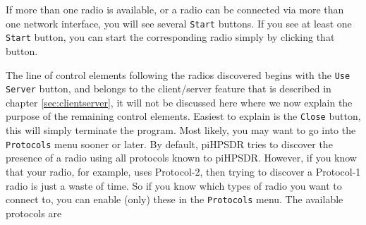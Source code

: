\documentclass[12pt]{book}
\def\rett#1{\texttt{\color{red}#1}}
\def\pH{pi\-HPSDR\xspace}
\begin{document}
If more than one radio is available, or a radio can be connected via more than one network interface,
you will see several \rett{Start} buttons.
If you see at least one \rett{Start} button, you can start the corresponding radio simply
by clicking that button.

The line of control elements following the radios discovered begins with the \rett{Use Server} button,
and belongs to the
client/server feature that is described in chapter \ref{sec:clientserver}, it will not be discussed
here where we now explain the purpose of the remaining control elements.
 Easiest to explain is the \rett{Close} button, this will simply terminate
the program. Most likely, you may want to go into the \rett{Protocols} menu sooner or later.
By default, \pH tries to discover the presence of a radio using all protocols known to \pH. However,
if you know that your radio, for example, uses Protocol-2, then trying to discover a Protocol-1
radio is just a waste of time. So if you know which types of radio you want to connect to, you can enable
(only) these in the \rett{Protocols} menu. The available protocols are
\end{document}

